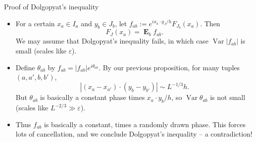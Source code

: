 \documentclass[10pt]{beamer}
\DeclareMathOperator{\Var}{Var}
\DeclareMathOperator*{\Expect}{\mathbf E}
\begin{document}
\begin{frame}{Proof of Dolgopyat's inequality}
\begin{itemize}
\item For a certain $x_a \in I_a$ and $y_b \in J_b$, let $f_{ab} := e^{ix_a \cdot y_J/h} F_{J_b}(x_a)$. Then 
$$F_J(x_a) = \Expect_b f_{ab}.$$
We may assume that Dolgopyat's inequality fails, in which case $\Var |f_{ab}|$ is small (scales like $\varepsilon$). \pause
\item Define $\theta_{ab}$ by $f_{ab} = |f_{ab}| e^{i\theta_{ab}}$. By our previous proposition, for many tuples $(a, a', b, b')$,
$$|(x_a - x_{a'}) \cdot (y_b - y_{b'})| \sim L^{-1/3} h.$$
But $\theta_{ab}$ is basically a constant phase times $x_a \cdot y_b/h$, so $\Var \theta_{ab}$ is not small (scales like $L^{-2/3} \gg \varepsilon$). \pause
\item Thus $f_{ab}$ is basically a constant, times a randomly drawn phase. This forces lots of cancellation, and we conclude Dolgopyat's inequality -- a contradiction!
\end{itemize}
\end{frame}
\end{document}
